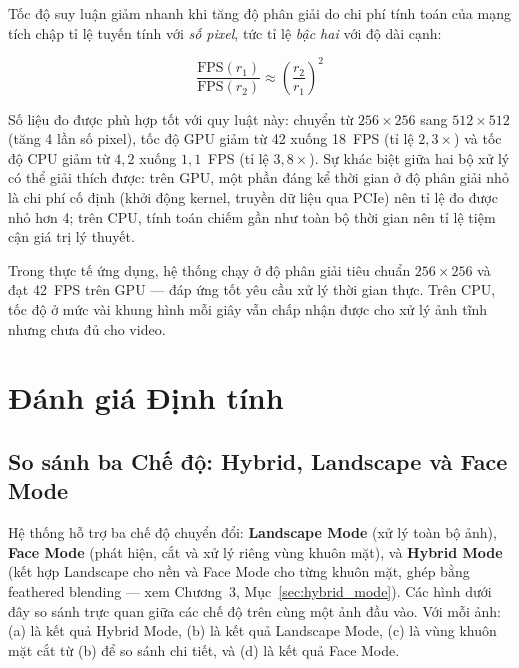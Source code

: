 Tốc độ suy luận giảm nhanh khi tăng độ phân giải do chi phí tính toán của mạng tích chập tỉ lệ tuyến tính với \textit{số pixel}, tức tỉ lệ \textit{bậc hai} với độ dài cạnh:

\begin{equation}
\label{eq:fps_scaling}
\frac{\text{FPS}(r_1)}{\text{FPS}(r_2)} \approx \left(\frac{r_2}{r_1}\right)^{2}
\end{equation}

Số liệu đo được phù hợp tốt với quy luật này: chuyển từ $256\times256$ sang $512\times512$ (tăng 4 lần số pixel), tốc độ GPU giảm từ 42 xuống 18~FPS (tỉ lệ $2{,}3\times$) và tốc độ CPU giảm từ $4{,}2$ xuống $1{,}1$~FPS (tỉ lệ $3{,}8\times$). Sự khác biệt giữa hai bộ xử lý có thể giải thích được: trên GPU, một phần đáng kể thời gian ở độ phân giải nhỏ là chi phí cố định (khởi động kernel, truyền dữ liệu qua PCIe) nên tỉ lệ đo được nhỏ hơn 4; trên CPU, tính toán chiếm gần như toàn bộ thời gian nên tỉ lệ tiệm cận giá trị lý thuyết.

Trong thực tế ứng dụng, hệ thống chạy ở độ phân giải tiêu chuẩn $256\times256$ và đạt 42~FPS trên GPU --- đáp ứng tốt yêu cầu xử lý thời gian thực. Trên CPU, tốc độ ở mức vài khung hình mỗi giây vẫn chấp nhận được cho xử lý ảnh tĩnh nhưng chưa đủ cho video.

\section{Đánh giá Định tính}
\label{sec:qualitative}

\subsection{So sánh ba Chế độ: Hybrid, Landscape và Face Mode}
\label{subsec:style_results}

Hệ thống hỗ trợ ba chế độ chuyển đổi: \textbf{Landscape Mode} (xử lý toàn bộ ảnh), \textbf{Face Mode} (phát hiện, cắt và xử lý riêng vùng khuôn mặt), và \textbf{Hybrid Mode} (kết hợp Landscape cho nền và Face Mode cho từng khuôn mặt, ghép bằng feathered blending --- xem Chương~3, Mục~\ref{sec:hybrid_mode}). Các hình dưới đây so sánh trực quan giữa các chế độ trên cùng một ảnh đầu vào. Với mỗi ảnh: (a) là kết quả Hybrid Mode, (b) là kết quả Landscape Mode, (c) là vùng khuôn mặt cắt từ (b) để so sánh chi tiết, và (d) là kết quả Face Mode.

